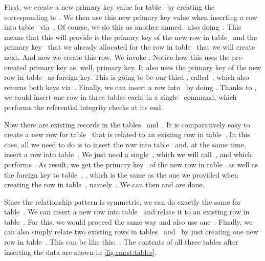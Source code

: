 First, we create a new primary key value for table~ by creating the ~ corresponding to .
We then use this new primary key value when inserting a row into table~ via~.
Of course, we do this as another  named~ also doing~.
This means that this  will provide is the primary key of the new row in table~ and the primary key~ that we already allocated for the row in table~ that we will create next.
And now we create this row.
We invoke .
Notice how this uses the pre-created primary key as, well, primary key.
It also uses the primary key of the new row in table~ as foreign key.
This is going to be our third , called~, which also returns both keys via~.
Finally, we can insert a row into~ by doing .
Thanks to , we could insert one row in three tables each, in a single \sql\ command, which performs the referential integrity checks at its end.%
%
\begin{sloppypar}%
Now there are existing records in the tables~ and~.
It is comparatively easy to create a new row for table~ that is related to an existing row in table~.
In this case, all we need to do is to insert the row into table~ and, at the same time, insert a row into table~.
We just need a single~, which we will call~, and which performs .
As result, we get the primary key~ of the new row in table~ as well as the foreign key to table~, , which is the same as the one we provided when creating the row in table~, namely~.
We can then  and are done.%
\end{sloppypar}%
%
\begin{sloppypar}%
Since the relationship pattern is symmetric, we can do exactly the same for table~.
We can insert a new row into table~ and relate it to an existing row in table~.
For this, we would proceed the same way and also use one~.
Finally, we can also simply relate two existing rows in tables~ and~ by just creating one new row in table~.
This can be like this:~.
The contents of all three tables after inserting the data are shown in \cref{fig:rm:st:tables}.%
\end{sloppypar}%
